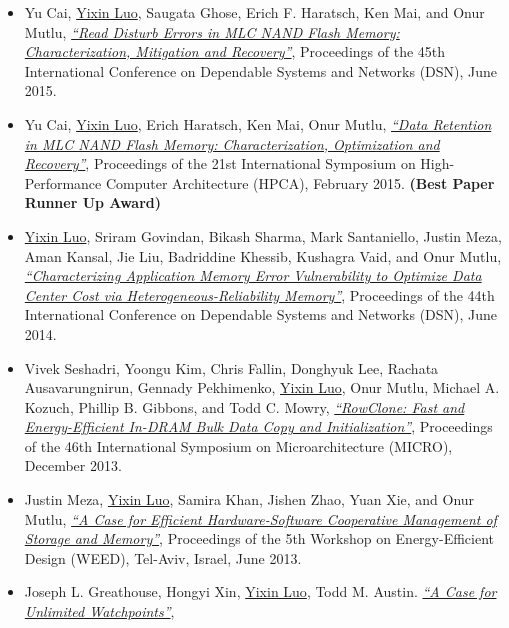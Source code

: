 \documentclass{cv}
\begin{document}
\begin{resume}
\begin{itemize}[leftmargin=4mm]
  \item Yu Cai, \underline{Yixin Luo}, Saugata Ghose, Erich F. Haratsch, Ken Mai, and Onur Mutlu,
        \href{http://www.cs.cmu.edu/~yixinluo/index_files/read-disturb-errors_dsn15.pdf}\emph{``Read Disturb Errors in MLC NAND Flash Memory: Characterization, Mitigation and Recovery''},
        Proceedings of the 45th International Conference on Dependable Systems and Networks (DSN), June 2015.
  \item Yu Cai, \underline{Yixin Luo}, Erich Haratsch, Ken Mai, Onur Mutlu,
        \href{http://www.cs.cmu.edu/~yixinluo/index_files/flash-memory-data-retention_hpca15.pdf}\emph{``Data Retention in MLC NAND Flash Memory: Characterization, Optimization and Recovery''}, 
        Proceedings of the 21st International Symposium on High-Performance Computer Architecture (HPCA), February 2015. {\bf (Best Paper Runner Up Award)}
  \item \underline{Yixin Luo}, Sriram Govindan, Bikash Sharma, Mark Santaniello, Justin Meza, Aman Kansal, Jie Liu, Badriddine Khessib, Kushagra Vaid, and Onur Mutlu, 
        \href{http://www.cs.cmu.edu/~yixinluo/index_files/heterogeneous-reliability-memory_dsn14.pdf}\emph{``Characterizing Application Memory Error Vulnerability to Optimize Data Center Cost via Heterogeneous-Reliability Memory''},
        Proceedings of the 44th International Conference on Dependable Systems and Networks (DSN), June 2014.
  \item Vivek Seshadri, Yoongu Kim, Chris Fallin, Donghyuk Lee, Rachata Ausavarungnirun, Gennady Pekhimenko, \underline{Yixin Luo}, Onur Mutlu, Michael A. Kozuch, Phillip B. Gibbons, and Todd C. Mowry,
        \href{http://www.cs.cmu.edu/~yixinluo/index_files/rowclone_micro13.pdf}\emph{``RowClone: Fast and Energy-Efficient In-DRAM Bulk Data Copy and Initialization''},
        Proceedings of the 46th International Symposium on Microarchitecture (MICRO), December 2013.
  \item Justin Meza, \underline{Yixin Luo}, Samira Khan, Jishen Zhao, Yuan Xie, and Onur Mutlu,
        \href{http://www.cs.cmu.edu/~yixinluo/index_files/persistent-memory-management_weed13.pdf}\emph{``A Case for Efficient Hardware-Software Cooperative Management of Storage and Memory''},
        Proceedings of the 5th Workshop on Energy-Efficient Design (WEED), Tel-Aviv, Israel, June 2013.
  \item Joseph L. Greathouse, Hongyi Xin, \underline{Yixin Luo}, Todd M. Austin.
        \href{http://www.cs.cmu.edu/~yixinluo/index_files/unlimited-watchpoints_asplos12.pdf}\emph{``A Case for Unlimited Watchpoints''},

\end{itemize}
\end{resume}
\end{document}
